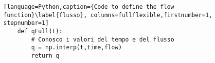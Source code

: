 \begin{lstlisting}[language=Python,caption={Code to define the flow function}\label{flusso}, columns=fullflexible,firstnumber=1, stepnumber=1]
    def qFull(t):
        # Conosco i valori del tempo e del flusso
        q = np.interp(t,time,flow)
        return q
\end{lstlisting}